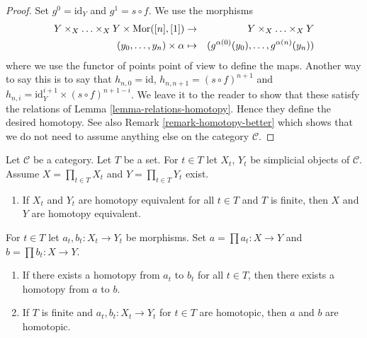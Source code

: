 \begin{proof}
Set $g^0 = \text{id}_Y$ and $g^1 = s \circ f$.
We use the morphisms
\begin{eqnarray*}
Y \times_X \ldots \times_X Y \times \mathop{\mathrm{Mor}}\nolimits([n], [1])
& \to &
Y \times_X \ldots \times_X Y \\
(y_0, \ldots, y_n) \times \alpha
& \mapsto &
(g^{\alpha(0)}(y_0), \ldots, g^{\alpha(n)}(y_n))
\end{eqnarray*}
where we use the functor of points point of view to define the maps.
Another way to say this is to say that
$h_{n, 0} = \text{id}$, $h_{n, n + 1} = (s \circ f)^{n + 1}$ and
$h_{n, i} = \text{id}_Y^{i + 1} \times (s \circ f)^{n + 1 - i}$.
We leave it to the reader to show that these satisfy the relations
of Lemma \ref{lemma-relations-homotopy}. Hence they define
the desired homotopy. See also Remark \ref{remark-homotopy-better}
which shows that
we do not need to assume anything else on the category $\mathcal{C}$.
\end{proof}

\begin{lemma}
\label{lemma-products-homotopy}
Let $\mathcal{C}$ be a category. Let $T$ be a set. For $t \in T$
let $X_t$, $Y_t$ be simplicial objects of $\mathcal{C}$. Assume
$X = \prod_{t \in T} X_t$ and $Y = \prod_{t \in T} Y_t$ exist.
\begin{enumerate}
\item If $X_t$ and $Y_t$ are homotopy equivalent for all $t \in T$
and $T$ is finite, then $X$ and $Y$ are homotopy equivalent.
\end{enumerate}
For $t \in T$ let $a_t, b_t : X_t \to Y_t$ be morphisms.
Set $a = \prod a_t : X \to Y$ and $b = \prod b_t : X \to Y$.
\begin{enumerate}
\item[(2)] If there exists a homotopy from $a_t$ to $b_t$ for
all $t \in T$, then there exists a homotopy from $a$ to $b$.
\item[(3)] If $T$ is finite and $a_t, b_t : X_t \to Y_t$ for $t \in T$
are homotopic, then $a$ and $b$ are homotopic.
\end{enumerate}
\end{lemma}

